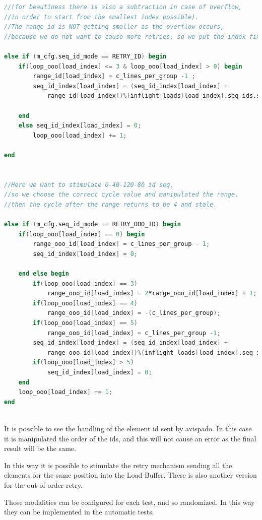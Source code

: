 \linespread{1}
\begin{lstlisting}[language=Verilog,style=verilog-style, backgroundcolor=\color{lyel_palette}, frame=tlb]
//(for beautiness there is also a subtraction in case of overflow, 
//in order to start from the smallest index possible).
//The range_id is NOT getting smaller as the overflow occurs, 
//because we do not want to cause more retries, so we put the index fixed to 0

else if (m_cfg.seq_id_mode == RETRY_ID) begin
    if(loop_ooo[load_index] <= 3 & loop_ooo[load_index] > 0) begin
        range_id[load_index] = c_lines_per_group -1 ;
        seq_id_index[load_index] = (seq_id_index[load_index] +
            range_id[load_index])%(inflight_loads[load_index].seq_ids.size());
            
    end
    else seq_id_index[load_index] = 0;
        loop_ooo[load_index] += 1;
        
end


//Here we want to stimulate 0-40-120-80 id seq, 
//so we choose the correct cycle value and manipulated the range.
//then the cycle after the range returns to be 4 and stale.

else if (m_cfg.seq_id_mode == RETRY_OOO_ID) begin
    if(loop_ooo[load_index] == 0) begin
        range_ooo_id[load_index] = c_lines_per_group - 1;
        seq_id_index[load_index] = 0;

    end else begin
        if(loop_ooo[load_index] == 3) 
            range_ooo_id[load_index] = 2*range_ooo_id[load_index] + 1;
        if(loop_ooo[load_index] == 4) 
            range_ooo_id[load_index] = -(c_lines_per_group);
        if(loop_ooo[load_index] == 5) 
            range_ooo_id[load_index] = c_lines_per_group -1;
        seq_id_index[load_index] = (seq_id_index[load_index] +
            range_ooo_id[load_index])%(inflight_loads[load_index].seq_ids.size());
        if(loop_ooo[load_index] > 5) 
            seq_id_index[load_index] = 0;
    end
    loop_ooo[load_index] += 1;
end



\end{lstlisting}
\linespread{1.2}

It is possible to see the handling of the element id sent by avispado. In this case it is manipulated the order of the ids, and this will not cause an error as the final result will be the same.

In this way it is possible to stimulate the retry mechanism sending all the elements for the same position into the Load Buffer. There is also another version for the out-of-order retry.

Those modalities can be configured for each test, and so randomized. In this way they can be implemented in the automatic tests.
